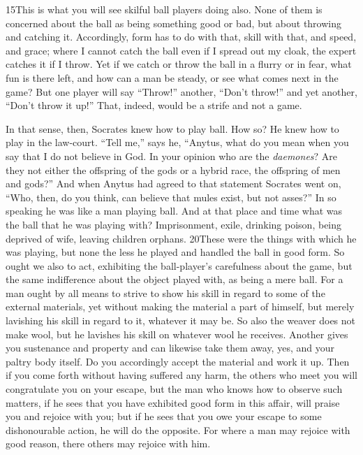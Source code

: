 15This is what you will see skilful ball players doing also. None of them is concerned about the ball as being something good or bad, but about throwing and catching it. Accordingly, form has to do with that, skill with that, and speed, and grace; where I cannot catch the ball even if I spread out my cloak, the expert catches it if I throw. Yet if we catch or throw the ball in a flurry or in fear, what fun is there left, and how can a man be steady, or see what comes next in the game? But one player will say ``Throw!'' another, ``Don't throw!'' and yet another, ``Don't throw it up!'' That, indeed, would be a strife and not a game.

In that sense, then, Socrates knew how to play ball. How so? He knew how to play in the law-court. ``Tell me,'' says he, ``Anytus, what do you mean when you say that I do not believe in God. In your opinion who are the \emph{daemones}? Are they not either the offspring of the gods or a hybrid race, the offspring of men and gods?'' And when Anytus had agreed to that statement Socrates went on, ``Who, then, do you think, can believe that mules exist, but not asses?'' In so speaking he was like a man playing ball. And at that place and time what was the ball that he was playing with? Imprisonment, exile, drinking poison, being deprived of wife, leaving children orphans. 20These were the things with which he was playing, but none the less he played and handled the ball in good form. So ought we also to act, exhibiting the ball-player's carefulness about the game, but the same indifference about the object played with, as being a mere ball. For a man ought by all means to strive to show his skill in regard to some of the external materials, yet without making the material a part of himself, but merely lavishing his skill in regard to it, whatever it may be. So also the weaver does not make wool, but he lavishes his skill on whatever wool he receives. Another gives you sustenance and property and can likewise take them away, yes, and your paltry body itself. Do you accordingly accept the material and work it up. Then if you come forth without having suffered any harm, the others who meet you will congratulate you on your escape, but the man who knows how to observe such matters, if he sees that you have exhibited good form in this affair, will praise you and rejoice with you; but if he sees that you owe your escape to some dishonourable action, he will do the opposite. For where a man may rejoice with good reason, there others may rejoice with him.

